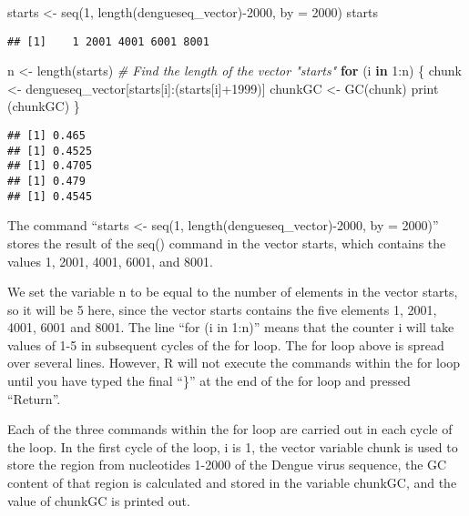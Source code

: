 \documentclass[
]{book}
\newenvironment{Shaded}{\begin{snugshade}}{\end{snugshade}}
\newcommand{\AttributeTok}[1]{\textcolor[rgb]{0.77,0.63,0.00}{#1}}
\newcommand{\CommentTok}[1]{\textcolor[rgb]{0.56,0.35,0.01}{\textit{#1}}}
\newcommand{\ControlFlowTok}[1]{\textcolor[rgb]{0.13,0.29,0.53}{\textbf{#1}}}
\newcommand{\DecValTok}[1]{\textcolor[rgb]{0.00,0.00,0.81}{#1}}
\newcommand{\FunctionTok}[1]{\textcolor[rgb]{0.00,0.00,0.00}{#1}}
\newcommand{\NormalTok}[1]{#1}
\newcommand{\OtherTok}[1]{\textcolor[rgb]{0.56,0.35,0.01}{#1}}
\newcommand{\SpecialCharTok}[1]{\textcolor[rgb]{0.00,0.00,0.00}{#1}}
\begin{document}
\begin{Shaded}
\begin{Highlighting}[]
\NormalTok{starts }\OtherTok{\textless{}{-}} \FunctionTok{seq}\NormalTok{(}\DecValTok{1}\NormalTok{, }\FunctionTok{length}\NormalTok{(dengueseq\_vector)}\SpecialCharTok{{-}}\DecValTok{2000}\NormalTok{, }\AttributeTok{by =} \DecValTok{2000}\NormalTok{)}
\NormalTok{starts}
\end{Highlighting}
\end{Shaded}

\begin{verbatim}
## [1]    1 2001 4001 6001 8001
\end{verbatim}

\begin{Shaded}
\begin{Highlighting}[]
\NormalTok{ n }\OtherTok{\textless{}{-}} \FunctionTok{length}\NormalTok{(starts)    }\CommentTok{\# Find the length of the vector "starts"}
 \ControlFlowTok{for}\NormalTok{ (i }\ControlFlowTok{in} \DecValTok{1}\SpecialCharTok{:}\NormalTok{n) \{}
\NormalTok{        chunk }\OtherTok{\textless{}{-}}\NormalTok{ dengueseq\_vector[starts[i]}\SpecialCharTok{:}\NormalTok{(starts[i]}\SpecialCharTok{+}\DecValTok{1999}\NormalTok{)]}
\NormalTok{        chunkGC }\OtherTok{\textless{}{-}} \FunctionTok{GC}\NormalTok{(chunk)}
        \FunctionTok{print}\NormalTok{ (chunkGC)}
\NormalTok{     \}}
\end{Highlighting}
\end{Shaded}

\begin{verbatim}
## [1] 0.465
## [1] 0.4525
## [1] 0.4705
## [1] 0.479
## [1] 0.4545
\end{verbatim}

The command ``starts \textless- seq(1, length(dengueseq\_vector)-2000, by = 2000)'' stores the result of the seq() command in the vector starts, which contains the values 1, 2001, 4001, 6001, and 8001.

We set the variable n to be equal to the number of elements in the vector starts, so it will be 5 here, since the vector starts contains the five elements 1, 2001, 4001, 6001 and 8001. The line ``for (i in 1:n)'' means that the counter i will take values of 1-5 in subsequent cycles of the for loop. The for loop above is spread over several lines. However, R will not execute the commands within the for loop until you have typed the final ``\}'' at the end of the for loop and pressed ``Return''.

Each of the three commands within the for loop are carried out in each cycle of the loop. In the first cycle of the loop, i is 1, the vector variable chunk is used to store the region from nucleotides 1-2000 of the Dengue virus sequence, the GC content of that region is calculated and stored in the variable chunkGC, and the value of chunkGC is printed out.
\end{document}
